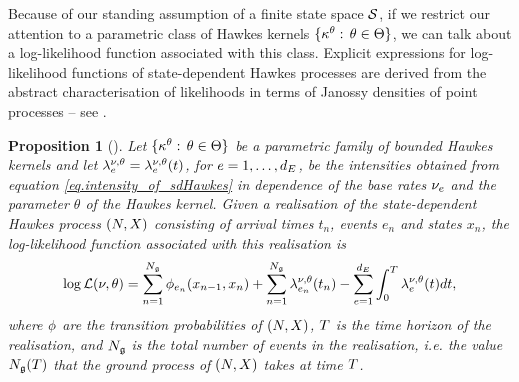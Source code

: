 \documentclass[10pt]{article}
\newtheorem{prop}[thm]{Proposition}
\begin{document}
Because of our standing assumption of a finite state space $\stateSpace$, if we restrict our attention to a parametric class of Hawkes kernels $\lbrace\hawkesKernel^\theta : \, \theta \in \Theta \rbrace$, we can talk about a log-likelihood function associated with this class. Explicit expressions for log-likelihood functions of state-dependent Hawkes processes are derived from the abstract characterisation of likelihoods in terms of Janossy densities of point processes -- see \cite[Chapters 7 and 14]{DVJ08int}.
\begin{prop}[{\cite[Theorem 3.1]{MP18sta}}]
 Let $\lbrace\hawkesKernel^\theta : \, \theta \in \Theta \rbrace$ be a parametric family of bounded Hawkes kernels and let $\intensity^{\baseRate,\theta}=\intensity^{\baseRate,\theta}(t)$, for $e=1,\dots, \numEventTypes$, be the intensities obtained from equation \eqref{eq.intensity_of_sdHawkes} in dependence of the base rates $\baseRate_e$ and the parameter $\theta$ of the Hawkes kernel.  Given a realisation of the state-dependent Hawkes process $(\multiCountingProc, \stateVariable)$ consisting of arrival times $t_n$, events $e_n$ and states $x_n$, the log-likelihood function associated with this realisation is 
 \begin{equation}\label{eq.loglikelihood_general}
  \log \likelihood (\nu,\theta) 
  =
  \sum_{n=1}^{\groundProc} \transProb_{e_n}(x_{n-1},x_{n})
  +\sum_{n=1}^{\groundProc} \intensity[e_{n}]^{\baseRate,\theta}(t_n)
  -\sum_{e=1}^{\numEventTypes} \int_{0}^{\timeHorizon} \intensity^{\baseRate,\theta}(t)dt, 
 \end{equation}
where $\transProb$ are the transition probabilities of $(\multiCountingProc, \stateVariable)$, $\timeHorizon$ is the time horizon of the realisation, and $\groundProc$ is the total number of events in the realisation, i.e. the value $\groundProc(\timeHorizon)$ that the ground process of  $(\multiCountingProc, \stateVariable)$ takes at time $\timeHorizon$. 
\end{prop}
\end{document}
